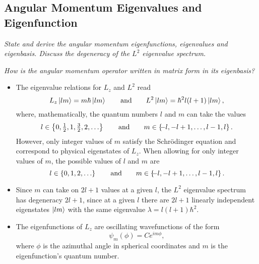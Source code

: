 \documentclass[11pt, a4paper]{article}
\newcommand{\Schro}{Schr\"{o}dinger\xspace}
\begin{document}
\subsection{Angular Momentum Eigenvalues and Eigenfunction}
\textit{State and derive the angular momentum eigenfunctions, eigenvalues and eigenbasis. Discuss the degeneracy of the $ L^{2} $ eigenvalue spectrum.}

\vspace{2mm}
\textit{How is the angular momentum operator written in matrix form in its eigenbasis?}

\begin{itemize}
    \item The eigenvalue relations for $ L_{z} $ and $ L^{2} $ read
    \begin{equation*}
        L_{z} \ket{lm} = m \hbar \ket{lm} \qquad \text{and} \qquad L^{2} \ket{lm} = \hbar^{2} l (l + 1) \ket{lm},
    \end{equation*}
    where, mathematically, the quantum numbers $ l $ and $ m $ can take the values
    \begin{equation*}
        l \in \left\{ 0, \tfrac{1}{2}, 1, \tfrac{3}{2}, 2, \ldots \right\} \qquad \text{and} \qquad m \in \left\{\hspace{-0.3em}-l, -l+1, \ldots, l-1, l\right\}.
    \end{equation*}
    However, only integer values of $ m $ satisfy the \Schro equation and correspond to physical eigenstates of $ L_{z} $. When allowing for only integer values of $ m $, the possible values of $ l $ and $ m $ are
    \begin{equation*}
        l \in \left\{ 0, 1, 2, \ldots \right\} \qquad \text{and} \qquad m \in \left\{\hspace{-0.3em}-l, -l+1, \ldots, l-1, l\right\}.
    \end{equation*}

	\item Since $ m $ can take on $ 2l + 1 $ values at a given $ l $, the $ L^{2} $ eigenvalue spectrum has degeneracy $ 2l + 1 $, since at a given $ l $ there are $ 2l + 1 $ linearly independent eigenstates $ \ket{lm} $ with the same eigenvalue $ \lambda = l (l+1)\hbar^{2} $. 

    \item The eigenfunctions of $ L_{z} $ are oscillating wavefunctions of the form
    \begin{equation*}
        \psi_{m}(\phi) = Ce^{im \phi},
    \end{equation*}
    where $ \phi $ is the azimuthal angle in spherical coordinates and $ m $ is the eigenfunction's quantum number.


\end{itemize}
\end{document}
